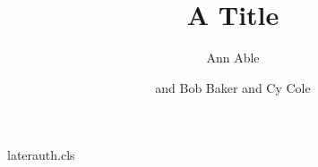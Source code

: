 \begin{filecontents*}[overwrite]{laterauth.cls}
\let\@author\@empty\renewcommand\author[2][]{\g@addto@macro\@author{#2 }}
\newcommand\address[2][]{\par{\small\ifx\relax#1\relax\else(#1) \fi #2}\par}
\def\affil#1{\par{\small #1}\par}
\def\inst#1{\textsuperscript{#1}}
\end{filecontents*}
\documentclass{laterauth}

\title{A Title}
\author{Ann Able}
\address[\inst{2}]{Univ B, City}
\address[\inst{4}]{Lab D, Place}
\author{and Bob Baker and Cy Cole}
\maketitle
Body.

